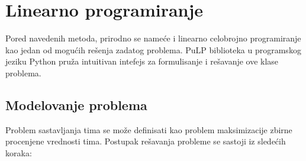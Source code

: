 \documentclass[a4paper]{article}
\begin{document}


\section{Linearno programiranje}

Pored navedenih metoda, prirodno se nameće i linearno celobrojno programiranje kao jedan od mogućih rešenja zadatog problema. PuLP biblioteka u programskog jeziku Python pruža intuitivan intefejs za formulisanje i rešavanje ove klase problema.

\subsection{Modelovanje problema}

Problem sastavljanja tima se može definisati kao problem maksimizacije zbirne procenjene vrednosti tima. Postupak rešavanja probleme se sastoji iz sledećih koraka:
\end{document}

